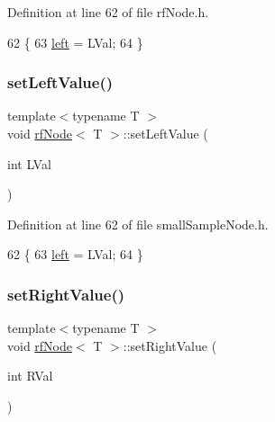 Definition at line 62 of file rf\+Node.\+h.


\begin{DoxyCode}
62                                           \{
63             \hyperlink{classrfNode_ac8e195fc3d8a9647f10a42153d76119f}{left} = LVal;    
64         \}
\end{DoxyCode}
\mbox{\label{classrfNode_a959c72aff3d20ca0552d2369e7d88188}} 
\subsubsection{\texorpdfstring{set\+Left\+Value()}{setLeftValue()}\hspace{0.1cm}{\footnotesize\ttfamily [2/2]}}
{\footnotesize\ttfamily template$<$typename T $>$ \\
void \hyperlink{classrfNode}{rf\+Node}$<$ T $>$\+::set\+Left\+Value (\begin{DoxyParamCaption}\item[{int}]{L\+Val }\end{DoxyParamCaption})\hspace{0.3cm}{\ttfamily [inline]}}



Definition at line 62 of file small\+Sample\+Node.\+h.


\begin{DoxyCode}
62                                           \{
63             \hyperlink{classrfNode_ac8e195fc3d8a9647f10a42153d76119f}{left} = LVal;    
64         \}
\end{DoxyCode}
\mbox{\label{classrfNode_a473dc8da457727bc50dea408320e6993}} 
\subsubsection{\texorpdfstring{set\+Right\+Value()}{setRightValue()}\hspace{0.1cm}{\footnotesize\ttfamily [1/2]}}
{\footnotesize\ttfamily template$<$typename T $>$ \\
void \hyperlink{classrfNode}{rf\+Node}$<$ T $>$\+::set\+Right\+Value (\begin{DoxyParamCaption}\item[{int}]{R\+Val }\end{DoxyParamCaption})\hspace{0.3cm}{\ttfamily [inline]}}



